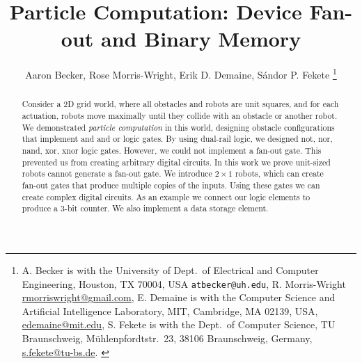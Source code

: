 \documentclass[letterpaper, 10 pt, conference]{ieeeconf}
\begin{document}


\title{\LARGE \bf 
Particle Computation:  Device Fan-out and Binary Memory 
}
\author{Aaron Becker,
Rose Morris-Wright,
Erik D. Demaine,
S\'andor P. Fekete
\thanks{{A. Becker is with the University of  Dept.~of Electrical and Computer Engineering, Houston, TX 70004, USA {\tt\small atbecker@uh.edu}, 
R. Morris-Wright  \protect\url{rmorriswright@gmail.com},
E. Demaine is with the Computer Science and Artificial Intelligence Laboratory, MIT, Cambridge, MA 02139, USA,      \protect\url{edemaine@mit.edu},
S. Fekete is with the Dept.~of Computer Science, TU Braunschweig,  M\"uhlenpfordtstr.~23, 38106 Braunschweig, Germany,
      \protect\url{s.fekete@tu-bs.de}.
}
} %
} %
\maketitle



\begin{abstract} %
Consider a 2D grid world, where all obstacles and robots are unit squares, and for each actuation, robots move maximally until they collide with an obstacle or another robot. We demonstrated \emph{particle computation} in this world, designing obstacle configurations that implement {\sc and} and {\sc or} logic gates.  By using dual-rail logic, we designed {\sc not, nor, nand, xor, xnor} logic gates.  However, we could not implement a {\sc fan-out} gate. This prevented us from creating arbitrary digital circuits.  In this work we prove unit-sized robots cannot generate a {\sc fan-out} gate.  We introduce $2\times 1$ robots, which can create fan-out gates that produce multiple copies of the inputs.  Using these gates we can create complex digital circuits.  As an example we connect our logic elements to produce a 3-bit counter.
   We also implement a data storage element.
\end{abstract}


\end{document}

